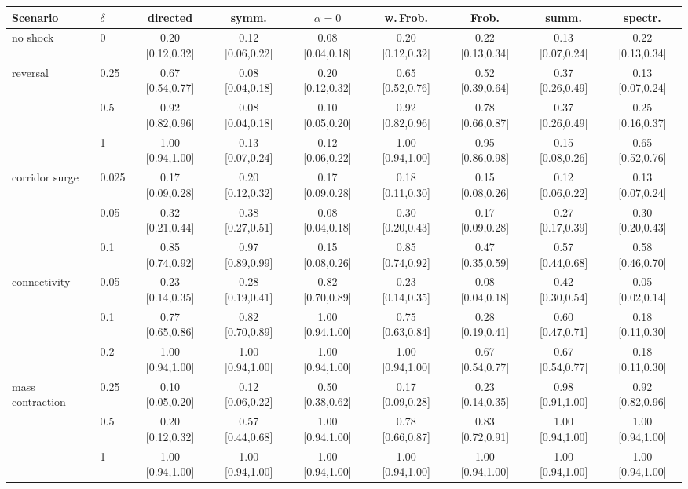 \begin{tabular}{llccccccc}
\toprule
Scenario & $\delta$ & directed & symm. & $\alpha{=}0$ & w.\,Frob. & Frob. & summ. & spectr.\\
\midrule
no shock & 0 & 0.20 {\tiny[0.12,0.32]} & 0.12 {\tiny[0.06,0.22]} & 0.08 {\tiny[0.04,0.18]} & 0.20 {\tiny[0.12,0.32]} & 0.22 {\tiny[0.13,0.34]} & 0.13 {\tiny[0.07,0.24]} & 0.22 {\tiny[0.13,0.34]}\\
reversal & 0.25 & 0.67 {\tiny[0.54,0.77]} & 0.08 {\tiny[0.04,0.18]} & 0.20 {\tiny[0.12,0.32]} & 0.65 {\tiny[0.52,0.76]} & 0.52 {\tiny[0.39,0.64]} & 0.37 {\tiny[0.26,0.49]} & 0.13 {\tiny[0.07,0.24]}\\
 & 0.5 & 0.92 {\tiny[0.82,0.96]} & 0.08 {\tiny[0.04,0.18]} & 0.10 {\tiny[0.05,0.20]} & 0.92 {\tiny[0.82,0.96]} & 0.78 {\tiny[0.66,0.87]} & 0.37 {\tiny[0.26,0.49]} & 0.25 {\tiny[0.16,0.37]}\\
 & 1 & 1.00 {\tiny[0.94,1.00]} & 0.13 {\tiny[0.07,0.24]} & 0.12 {\tiny[0.06,0.22]} & 1.00 {\tiny[0.94,1.00]} & 0.95 {\tiny[0.86,0.98]} & 0.15 {\tiny[0.08,0.26]} & 0.65 {\tiny[0.52,0.76]}\\
corridor surge & 0.025 & 0.17 {\tiny[0.09,0.28]} & 0.20 {\tiny[0.12,0.32]} & 0.17 {\tiny[0.09,0.28]} & 0.18 {\tiny[0.11,0.30]} & 0.15 {\tiny[0.08,0.26]} & 0.12 {\tiny[0.06,0.22]} & 0.13 {\tiny[0.07,0.24]}\\
 & 0.05 & 0.32 {\tiny[0.21,0.44]} & 0.38 {\tiny[0.27,0.51]} & 0.08 {\tiny[0.04,0.18]} & 0.30 {\tiny[0.20,0.43]} & 0.17 {\tiny[0.09,0.28]} & 0.27 {\tiny[0.17,0.39]} & 0.30 {\tiny[0.20,0.43]}\\
 & 0.1 & 0.85 {\tiny[0.74,0.92]} & 0.97 {\tiny[0.89,0.99]} & 0.15 {\tiny[0.08,0.26]} & 0.85 {\tiny[0.74,0.92]} & 0.47 {\tiny[0.35,0.59]} & 0.57 {\tiny[0.44,0.68]} & 0.58 {\tiny[0.46,0.70]}\\
connectivity & 0.05 & 0.23 {\tiny[0.14,0.35]} & 0.28 {\tiny[0.19,0.41]} & 0.82 {\tiny[0.70,0.89]} & 0.23 {\tiny[0.14,0.35]} & 0.08 {\tiny[0.04,0.18]} & 0.42 {\tiny[0.30,0.54]} & 0.05 {\tiny[0.02,0.14]}\\
 & 0.1 & 0.77 {\tiny[0.65,0.86]} & 0.82 {\tiny[0.70,0.89]} & 1.00 {\tiny[0.94,1.00]} & 0.75 {\tiny[0.63,0.84]} & 0.28 {\tiny[0.19,0.41]} & 0.60 {\tiny[0.47,0.71]} & 0.18 {\tiny[0.11,0.30]}\\
 & 0.2 & 1.00 {\tiny[0.94,1.00]} & 1.00 {\tiny[0.94,1.00]} & 1.00 {\tiny[0.94,1.00]} & 1.00 {\tiny[0.94,1.00]} & 0.67 {\tiny[0.54,0.77]} & 0.67 {\tiny[0.54,0.77]} & 0.18 {\tiny[0.11,0.30]}\\
mass contraction & 0.25 & 0.10 {\tiny[0.05,0.20]} & 0.12 {\tiny[0.06,0.22]} & 0.50 {\tiny[0.38,0.62]} & 0.17 {\tiny[0.09,0.28]} & 0.23 {\tiny[0.14,0.35]} & 0.98 {\tiny[0.91,1.00]} & 0.92 {\tiny[0.82,0.96]}\\
 & 0.5 & 0.20 {\tiny[0.12,0.32]} & 0.57 {\tiny[0.44,0.68]} & 1.00 {\tiny[0.94,1.00]} & 0.78 {\tiny[0.66,0.87]} & 0.83 {\tiny[0.72,0.91]} & 1.00 {\tiny[0.94,1.00]} & 1.00 {\tiny[0.94,1.00]}\\
 & 1 & 1.00 {\tiny[0.94,1.00]} & 1.00 {\tiny[0.94,1.00]} & 1.00 {\tiny[0.94,1.00]} & 1.00 {\tiny[0.94,1.00]} & 1.00 {\tiny[0.94,1.00]} & 1.00 {\tiny[0.94,1.00]} & 1.00 {\tiny[0.94,1.00]}\\
\bottomrule
\end{tabular}
